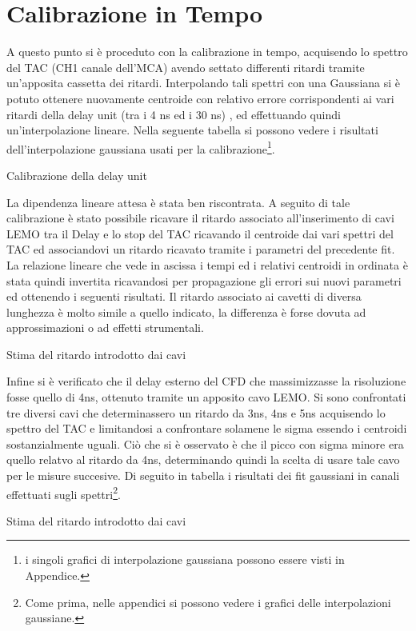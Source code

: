 


\section{Calibrazione in Tempo}

A questo punto si è proceduto con la calibrazione in tempo, acquisendo lo spettro del TAC (CH1 canale dell'MCA) avendo settato differenti ritardi tramite 
un'apposita cassetta dei ritardi. Interpolando tali spettri con una Gaussiana si è potuto ottenere nuovamente centroide con relativo 
errore corrispondenti ai vari ritardi della delay unit (tra i 4 ns ed i 30 ns) ,
ed effettuando quindi un'interpolazione lineare. Nella seguente tabella si possono vedere i risultati dell'interpolazione gaussiana usati per la calibrazione\footnote{i singoli grafici di interpolazione gaussiana possono essere visti in Appendice.}. \\
%
\begin{table}[h]
	\centering
	
	\caption{Calibrazione della delay unit}
	\label{tab:calib_delay}
\end{table}
%
%
%	
%

%

La dipendenza lineare attesa è stata ben riscontrata.
A seguito di tale calibrazione è stato possibile ricavare il ritardo associato all'inserimento di cavi LEMO tra il Delay e lo stop del TAC ricavando il centroide dai vari spettri del 
TAC ed associandovi un ritardo ricavato tramite i parametri del precedente fit. La relazione lineare che vede in ascissa i tempi ed i relativi centroidi in ordinata è stata 
quindi invertita ricavandosi per propagazione gli errori sui nuovi parametri ed ottenendo i seguenti risultati. Il ritardo associato ai cavetti di diversa lunghezza è molto simile
a quello indicato, la differenza è forse dovuta ad approssimazioni o ad effetti strumentali.\\

\begin{table}[h]
	\centering
	
	\caption{Stima del ritardo introdotto dai cavi}
	\label{tab:calib_cavi}
\end{table}
 
Infine si è verificato che il delay esterno del CFD che massimizzasse la risoluzione fosse quello di 4ns, ottenuto tramite un apposito cavo LEMO. Si sono confrontati tre diversi cavi
che determinassero un ritardo da 3ns, 4ns e 5ns acquisendo lo spettro del TAC e limitandosi a confrontare solamene le sigma essendo i centroidi sostanzialmente uguali. Ciò che si 
è osservato è che il picco con sigma minore era quello relatvo al ritardo da 4ns, determinando quindi la scelta di usare tale cavo per le misure succesive. Di seguito in tabella
i risultati dei fit gaussiani in canali effettuati sugli spettri\footnote{Come prima, nelle appendici si possono vedere i grafici delle interpolazioni gaussiane.}. \\

\begin{table}[h]
	\centering
	
	\caption{Stima del ritardo introdotto dai cavi}
	\label{tab:calib_cavi}
\end{table}



